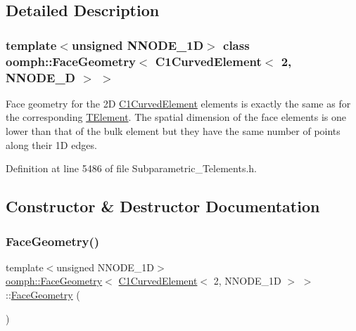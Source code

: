 \subsection{Detailed Description}
\subsubsection*{template$<$unsigned N\+N\+O\+D\+E\+\_\+1D$>$\newline
class oomph\+::\+Face\+Geometry$<$ C1\+Curved\+Element$<$ 2, N\+N\+O\+D\+E\+\_\+D $>$ $>$}

Face geometry for the 2D \hyperlink{classoomph_1_1C1CurvedElement}{C1\+Curved\+Element} elements is exactly the same as for the corresponding \hyperlink{classoomph_1_1TElement}{T\+Element}. The spatial dimension of the face elements is one lower than that of the bulk element but they have the same number of points along their 1D edges. 

Definition at line 5486 of file Subparametric\+\_\+\+Telements.\+h.



\subsection{Constructor \& Destructor Documentation}
\mbox{\label{classoomph_1_1FaceGeometry_3_01C1CurvedElement_3_012_00_01NNODE__1D_01_4_01_4_a72bc38ac6bbdedd73cb1956781f9d49d}} 
\subsubsection{\texorpdfstring{Face\+Geometry()}{FaceGeometry()}}
{\footnotesize\ttfamily template$<$unsigned N\+N\+O\+D\+E\+\_\+1D$>$ \\
\hyperlink{classoomph_1_1FaceGeometry}{oomph\+::\+Face\+Geometry}$<$ \hyperlink{classoomph_1_1C1CurvedElement}{C1\+Curved\+Element}$<$ 2, N\+N\+O\+D\+E\+\_\+1D $>$ $>$\+::\hyperlink{classoomph_1_1FaceGeometry}{Face\+Geometry} (\begin{DoxyParamCaption}{ }\end{DoxyParamCaption})\hspace{0.3cm}{\ttfamily [inline]}}



